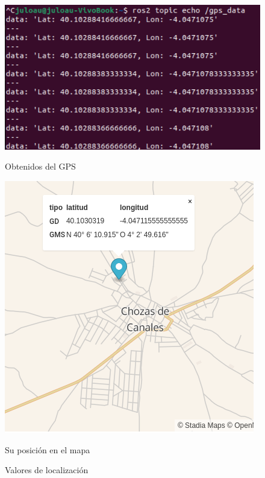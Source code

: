 \begin{figure}[ht!]
	\centering
	\begin{minipage}{0.56\linewidth}
		\centering
		\includegraphics[width=\linewidth]{figs/cap6/echo_gps_controller.png}
		\caption*{\centering Obtenidos del GPS}
	\end{minipage}
	\hspace{1cm}
	\begin{minipage}{0.35\linewidth}
		\centering
		\includegraphics[width=\linewidth]{figs/cap6/localizacion.png}
		\caption*{\centering Su posición en el mapa}
	\end{minipage}
	\caption{Valores de localización}
	\label{fig:gpsnode}
\end{figure}

